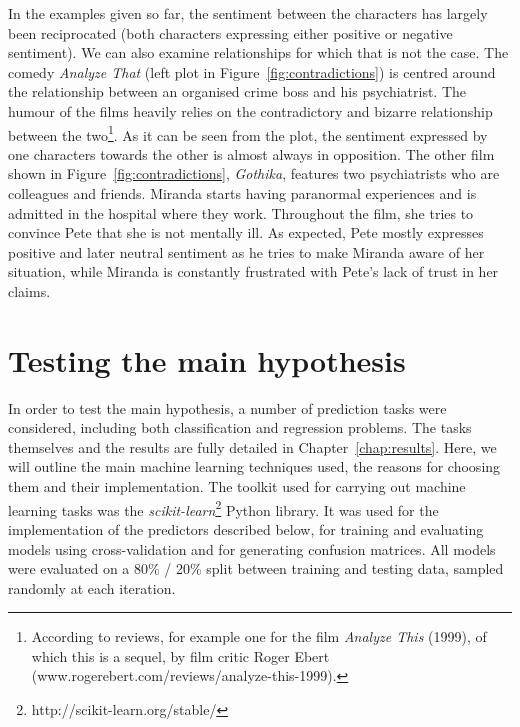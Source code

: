 \documentclass[bsc,frontabs,singlespacing,parskip, twoside]{infthesis}
\begin{document}
In the examples given so far, the sentiment between the characters has largely been reciprocated (both characters expressing either positive or negative sentiment). We can also examine relationships for which that is not the case. The comedy \textit{Analyze That} (left plot in Figure~\ref{fig:contradictions}) is centred around the relationship between an organised crime boss and his psychiatrist. The humour of the films heavily relies on the contradictory and bizarre relationship between the two\footnote{According to reviews, for example one for the film \textit{Analyze This} (1999), of which this is a sequel, by film critic Roger Ebert (www.rogerebert.com/reviews/analyze-this-1999).}. As it can be seen from the plot, the sentiment expressed by one characters towards the other is almost always in opposition. The other film shown in Figure~\ref{fig:contradictions}, \textit{Gothika}, features two psychiatrists who are colleagues and friends. Miranda starts having paranormal experiences and is admitted in the hospital where they work. Throughout the film, she tries to convince Pete that she is not mentally ill. As expected, Pete mostly expresses positive and later neutral sentiment as he tries to make Miranda aware of her situation, while Miranda is constantly frustrated with Pete's lack of trust in her claims.


\section{Testing the main hypothesis}
\label{sec:predictors}
In order to test the main hypothesis, a number of prediction tasks were considered, including both classification and regression problems. The tasks themselves and the results are fully detailed in Chapter~\ref{chap:results}. Here, we will outline the main machine learning techniques used, the reasons for choosing them and their implementation. The toolkit used for carrying out machine learning tasks was the \textit{scikit-learn}\footnote{http://scikit-learn.org/stable/} Python library. It was used for the implementation of the predictors described below, for training and evaluating models using cross-validation and for generating confusion matrices. All models were evaluated on a 80\% / 20\% split between training and testing data, sampled randomly at each iteration.
\end{document}
